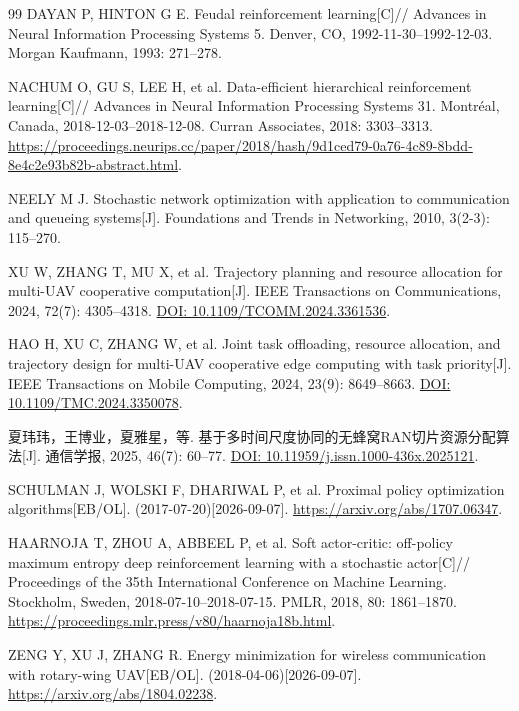 \begin{thebibliography}{99}
\small
\setlength{\itemsep}{2pt}
DAYAN P, HINTON G E.
Feudal reinforcement learning[C]//
Advances in Neural Information Processing Systems 5.
Denver, CO, 1992-11-30--1992-12-03.
Morgan Kaufmann, 1993: 271--278.

NACHUM O, GU S, LEE H, et al.
Data-efficient hierarchical reinforcement learning[C]//
Advances in Neural Information Processing Systems 31.
Montr{\'e}al, Canada, 2018-12-03--2018-12-08.
Curran Associates, 2018: 3303--3313.
\url{https://proceedings.neurips.cc/paper/2018/hash/9d1ced79-0a76-4c89-8bdd-8e4c2e93b82b-abstract.html}.

NEELY M J.
Stochastic network optimization with application to communication and queueing systems[J].
Foundations and Trends in Networking, 2010, 3(2-3): 115--270.

XU W, ZHANG T, MU X, et al.
Trajectory planning and resource allocation for multi-UAV cooperative computation[J].
IEEE Transactions on Communications, 2024, 72(7): 4305--4318.
\href{https://doi.org/10.1109/TCOMM.2024.3361536}{DOI: 10.1109/TCOMM.2024.3361536}.

HAO H, XU C, ZHANG W, et al.
Joint task offloading, resource allocation, and trajectory design for multi-UAV cooperative edge computing with task priority[J].
IEEE Transactions on Mobile Computing, 2024, 23(9): 8649--8663.
\href{https://doi.org/10.1109/TMC.2024.3350078}{DOI: 10.1109/TMC.2024.3350078}.

夏玮玮，王博业，夏雅星，等.
基于多时间尺度协同的无蜂窝RAN切片资源分配算法[J].
通信学报, 2025, 46(7): 60--77.
\href{https://doi.org/10.11959/j.issn.1000-436x.2025121}{DOI: 10.11959/j.issn.1000-436x.2025121}.

SCHULMAN J, WOLSKI F, DHARIWAL P, et al.
Proximal policy optimization algorithms[EB/OL].
(2017-07-20)[2026-09-07].
\url{https://arxiv.org/abs/1707.06347}.

HAARNOJA T, ZHOU A, ABBEEL P, et al.
Soft actor-critic: off-policy maximum entropy deep reinforcement learning with a stochastic actor[C]//
Proceedings of the 35th International Conference on Machine Learning.
Stockholm, Sweden, 2018-07-10--2018-07-15.
PMLR, 2018, 80: 1861--1870.
\url{https://proceedings.mlr.press/v80/haarnoja18b.html}.

ZENG Y, XU J, ZHANG R.
Energy minimization for wireless communication with rotary-wing UAV[EB/OL].
(2018-04-06)[2026-09-07].
\url{https://arxiv.org/abs/1804.02238}.


\end{thebibliography}
